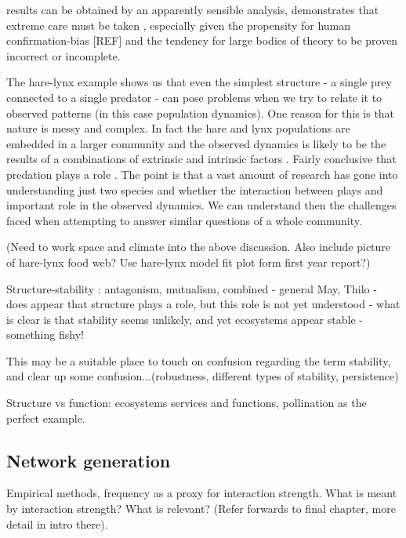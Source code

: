 results can be obtained by an apparently sensible analysis, demonstrates that extreme care must be taken , especially given the propensity for human confirmation-bias [REF] and the tendency for large bodies of theory to be proven incorrect or incomplete.     

The hare-lynx example shows us that even the simplest structure - a single prey connected to a single predator - can pose problems when we try to relate it to observed patterns (in this case population dynamics). One reason for this is that nature is messy and complex. In fact the hare and lynx populations are embedded in a larger community \cite{stenseth1997population} and the observed dynamics is likely to be the results of a combinations of extrinsic and intrinsic factors \cite{andreassen2013new}. Fairly conclusive that predation plays a role \cite{krebs2011lemmings}. The point is that a vast amount of research has gone into understanding just two species and whether the interaction between plays and important role in the observed dynamics. We can understand then the challenges faced when attempting to answer similar questions of a whole community.


(Need to work space and climate into the above discussion. Also include picture of hare-lynx food web? Use hare-lynx model fit plot form first year report?)


Structure-stability : antagonism, mutualism, combined - general May, Thilo - does appear that structure plays a role, but this role is not yet understood - what is clear is that stability seems unlikely, and yet ecosystems appear stable - something fishy!

This may be a suitable place to touch on confusion regarding the term stability, and clear up some confusion...(robustness, different types of stability, persistence)

Structure vs function: ecosystems services and functions, pollination as the perfect example.

\subsection{Network generation}
\label{sec:intro_net_gen}

Empirical methods, frequency as a proxy for interaction strength. What is meant by interaction strength? What is relevant? (Refer forwards to final chapter, more detail in intro there). 

